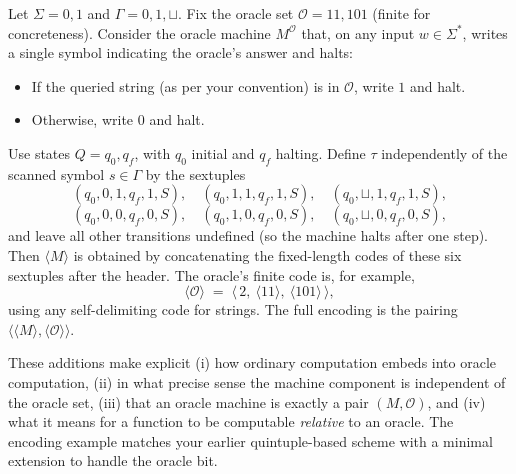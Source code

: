 \begin{example}
\label{ex:encode_otm}
Let $\Sigma={0,1}$ and $\Gamma={0,1,\sqcup}$. Fix the oracle set $\mathcal{O}={11,101}$ (finite for concreteness). Consider the oracle machine $M^{\mathcal{O}}$ that, on any input $w\in\Sigma^\ast$, writes a single symbol indicating the oracle's answer and halts:
\begin{itemize}
\item If the queried string (as per your convention) is in $\mathcal{O}$, write $1$ and halt.
\item Otherwise, write $0$ and halt.
\end{itemize}
Use states $Q={q_0,q_f}$, with $q_0$ initial and $q_f$ halting. Define $\tau$ independently of the scanned symbol $s\in\Gamma$ by the sextuples
\[
(q_0,0,1,q_f,1,S),\quad (q_0,1,1,q_f,1,S),\quad (q_0,\sqcup,1,q_f,1,S),
\]
\[
(q_0,0,0,q_f,0,S),\quad (q_0,1,0,q_f,0,S),\quad (q_0,\sqcup,0,q_f,0,S),
\]
and leave all other transitions undefined (so the machine halts after one step). Then $\langle M\rangle$ is obtained by concatenating the fixed-length codes of these six sextuples after the header. The oracle's finite code is, for example,
\[
\langle \mathcal{O}\rangle \;=\; \big\langle\, 2,\ \langle 11\rangle,\ \langle 101\rangle \,\big\rangle,
\]
using any self-delimiting code for strings. The full encoding is the pairing $\big\langle \langle M\rangle,\langle \mathcal{O}\rangle\big\rangle$.
\end{example}

These additions make explicit (i) how ordinary computation embeds into oracle computation, (ii) in what precise sense the machine component is independent of the oracle set, (iii) that an oracle machine is exactly a pair $(M,\mathcal{O})$, and (iv) what it means for a function to be computable \emph{relative} to an oracle. The encoding example matches your earlier quintuple-based scheme with a minimal extension to handle the oracle bit.

%
%



